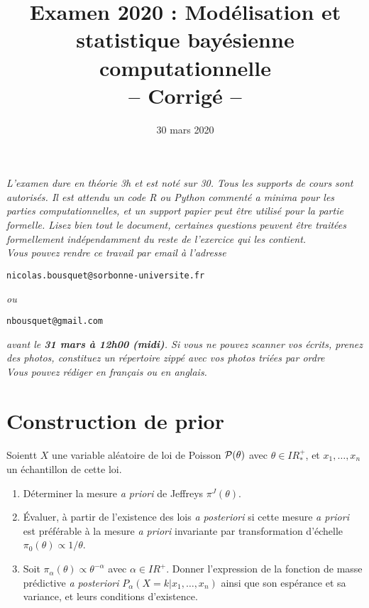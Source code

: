 \documentclass[10pt]{article}
\title{Examen 2020 : Modélisation et statistique bayésienne computationnelle \\ -- Corrig\'e -- }
\date{30 mars 2020}
\newcommand{\R}{I\!\!R}
\newcommand{\E}{\mbox{E}}
\newcommand{\V}{\mbox{Var}}
\newcommand{\1}{\mathbbm{1}}
\begin{document}
\maketitle

 




{\it L'examen dure en théorie 3h et est noté sur 30. Tous les supports de cours sont autorisés. Il est attendu un code R ou Python commenté {\it a minima} pour les parties computationnelles, et un support papier peut être utilisé pour la partie formelle. Lisez bien tout le document, certaines questions peuvent être traitées formellement indépendamment du reste de l'exercice qui les contient.} \\

{\it Vous pouvez rendre ce travail par email à l'adresse} 
\begin{center}
 \texttt{nicolas.bousquet@sorbonne-universite.fr} 
 \end{center} 
{\it ou }
 \begin{center}
 \texttt{nbousquet@gmail.com} 
  \end{center} 
{\it avant le {\bf 31 mars à 12h00 (midi)}. Si vous ne pouvez scanner vos écrits, prenez des photos, constituez un répertoire zippé avec vos photos triées par ordre} \\

 {\it Vous pouvez rédiger en fran\c cais ou en anglais.} \\ 


\section{Construction de prior}

Soientt $X$ une variable aléatoire de loi de Poisson ${\cal{P}}(\theta)$ avec $\theta\in\R^+_*$, et $x_1,\ldots,x_n$ un échantillon de cette loi.
\begin{enumerate}
\item Déterminer la mesure {\it a priori} de Jeffreys $\pi^J(\theta)$.
\item \'Evaluer, à partir de l'existence des lois {\it a posteriori} si cette mesure {\it a priori} est préférable à la mesure {\it a priori} invariante par transformation d'échelle $\pi_0(\theta)\propto1/\theta$.
\item Soit $\pi_{\alpha}(\theta) \propto \theta^{-\alpha}$ avec $\alpha\in\R^+$. Donner l'expression de la fonction de masse prédictive {\it a posteriori} $P_{\alpha}(X=k|x_1,\ldots,x_n)$ ainsi que son espérance et sa variance, et leurs conditions d'existence.
\end{enumerate}
\end{document}
